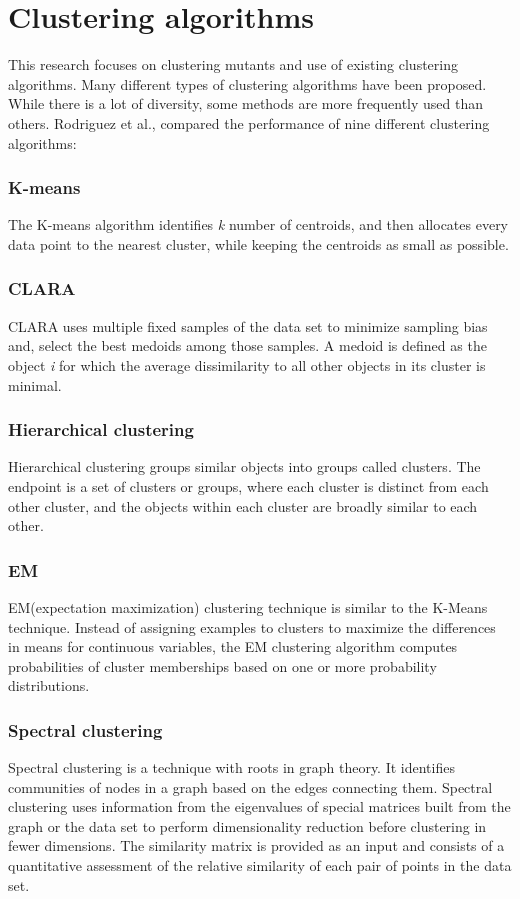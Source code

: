 \documentclass[../main]{subfiles}
\begin{document}
\section{Clustering algorithms}
This research focuses on clustering mutants and use of existing clustering algorithms. 
Many different types of clustering algorithms have been proposed\cite{Rodriguez2019}. While there is a lot of diversity, some methods are more frequently used than others\cite{Wu2008TopMining}. 
Rodriguez et al., compared the performance of nine different clustering algorithms:

\subsubsection{K-means} 
The K-means algorithm identifies \textit{k} number of centroids, and then allocates every data point to the nearest cluster, while keeping the centroids as small as possible\cite{Hartigan1979AlgorithmAlgorithm}.
\subsubsection{CLARA} 
CLARA uses multiple fixed samples of the data set to minimize sampling bias and, select the best medoids among those samples\cite{Sarle1991FindingAnalysis.}.
A medoid is defined as the object \textit{i} for which the average dissimilarity to all other objects in its cluster is minimal\cite{Sarle1991FindingAnalysis.}.
\subsubsection{Hierarchical clustering} 
Hierarchical clustering groups similar objects into groups called clusters\cite{Fraley1998HowAnalysis}. 
The endpoint is a set of clusters or groups, where each cluster is distinct from each other cluster, and the objects within each cluster are broadly similar to each other\cite{Fraley1998HowAnalysis}.
\subsubsection{EM} 
EM(expectation maximization) clustering technique is similar to the K-Means technique\cite{Fv1996TheAlgorithm}.
Instead of assigning examples to clusters to maximize the differences in means for continuous variables, the EM clustering algorithm computes probabilities of cluster memberships based on one or more probability distributions\cite{Fv1996TheAlgorithm}. 
\subsubsection{Spectral clustering}
Spectral clustering is a technique with roots in graph theory.
It identifies communities of nodes in a graph based on the edges connecting them\cite{Filippone2008AClustering}.
Spectral clustering uses information from the eigenvalues of special matrices built from the graph or the data set  to perform dimensionality reduction before clustering in fewer dimensions\cite{Filippone2008AClustering}. 
The similarity matrix is provided as an input and consists of a quantitative assessment of the relative similarity of each pair of points in the data set\cite{Filippone2008AClustering}.
\end{document}
